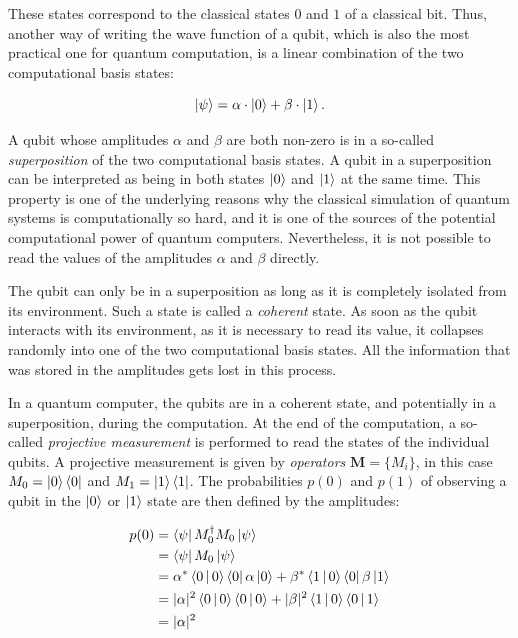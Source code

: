 These states correspond to the classical states $0$ and $1$ of a classical bit. Thus, another way of writing the wave
function of a qubit, which is also the most practical one for quantum computation, is a linear combination of the
two computational basis states:

\begin{equation}
  \Ket{\psi} = \alpha \cdot \Ket{0} + \beta \cdot \Ket{1}.
\end{equation}

A qubit whose amplitudes $\alpha$ and $\beta$ are both non-zero is in a so-called \textit{superposition} of the two
computational basis states. A qubit in a superposition can be interpreted as being in both states $\Ket{0}$ and $\Ket{1}$ at the same time.
This property is one of the underlying reasons why the classical simulation of
quantum systems is computationally so hard, and it is one of the sources of the potential computational power of quantum computers.
Nevertheless, it is not possible to read the values of the amplitudes $\alpha$ and $\beta$
directly.

The qubit can only be in a superposition as long as it is completely isolated
from its environment. Such a state is called a \textit{coherent} state. As
soon as the qubit interacts with its environment, as it is necessary to read
its value, it collapses randomly into one of the two computational basis
states. All the information that was stored in the amplitudes gets lost in this process.

In a quantum computer, the qubits are in a coherent state, and potentially in a superposition, during the computation. At the end of the computation, a so-called
\textit{projective measurement} is performed to read the states of the individual qubits. A projective measurement is given
by \textit{operators} $\textbf{M} = \{M_i\}$, in this case $M_0 = \Ket{0}\Bra{0}$ and $M_1 = \Ket{1}\Bra{1}$. The probabilities $p(0)$ and $p(1)$ of observing a qubit in the $\Ket{0}$ or
$\Ket{1}$ state are then defined by the amplitudes:

\begin{align}
  p(0) &= \Bra{\psi} M_0^{\dagger}M_0 \Ket{\psi} \\
       &=  \Bra{\psi} M_0 \Ket{\psi} \\
       &= \alpha^* \Braket{0|0} \Bra{0} \alpha \Ket{0} + \beta^* \Braket{1|0} \Bra{0} \beta \Ket{1} \\
       &= |\alpha|^2 \Braket{0|0} \Braket{0|0} + |\beta|^2 \Braket{1|0} \Braket{0|1} \\
       &= |\alpha|^2
\end{align}

